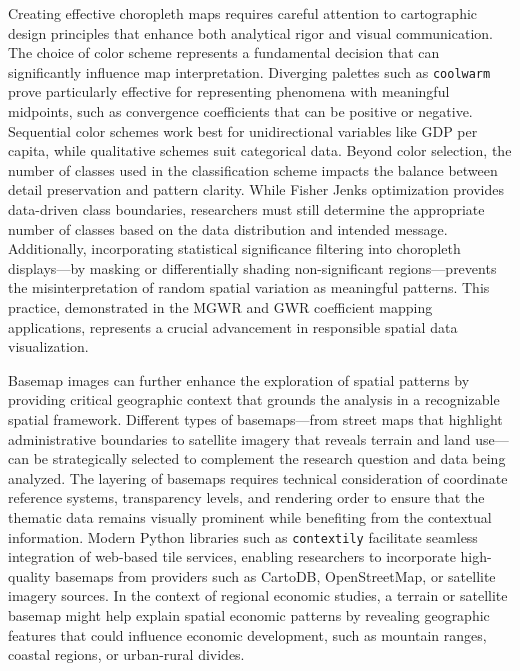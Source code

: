 \documentclass[smallextended, natbib]{svjour3}       %
\begin{document}
Creating effective choropleth maps requires careful attention to cartographic design principles that enhance both analytical rigor and visual communication.
The choice of color scheme represents a fundamental decision that can significantly influence map interpretation.
Diverging palettes such as \texttt{coolwarm} prove particularly effective for representing phenomena with meaningful midpoints, such as convergence coefficients that can be positive or negative.
Sequential color schemes work best for unidirectional variables like GDP per capita, while qualitative schemes suit categorical data.
Beyond color selection, the number of classes used in the classification scheme impacts the balance between detail preservation and pattern clarity.
While Fisher Jenks optimization provides data-driven class boundaries, researchers must still determine the appropriate number of classes based on the data distribution and intended message.
Additionally, incorporating statistical significance filtering into choropleth displays—by masking or differentially shading non-significant regions—prevents the misinterpretation of random spatial variation as meaningful patterns.
This practice, demonstrated in the MGWR and GWR coefficient mapping applications, represents a crucial advancement in responsible spatial data visualization.

Basemap images can further enhance the exploration of spatial patterns by providing critical geographic context that grounds the analysis in a recognizable spatial framework. 
Different types of basemaps---from street maps that highlight administrative boundaries to satellite imagery that reveals terrain and land use---can be strategically selected to complement the research question and data being analyzed.
The layering of basemaps requires technical consideration of coordinate reference systems, transparency levels, and rendering order to ensure that the thematic data remains visually prominent while benefiting from the contextual information.
Modern Python libraries such as \texttt{contextily} facilitate seamless integration of web-based tile services, enabling researchers to incorporate high-quality basemaps from providers such as CartoDB, OpenStreetMap, or satellite imagery sources.
In the context of regional economic studies, a terrain or satellite basemap might help explain spatial economic patterns by revealing geographic features that could influence economic development, such as mountain ranges, coastal regions, or urban-rural divides.
\end{document}
